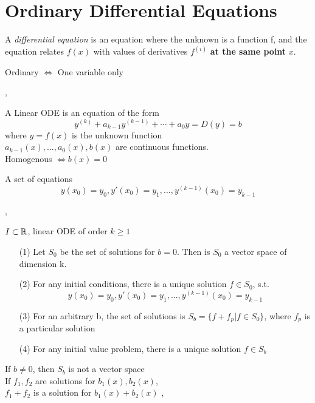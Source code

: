 \part{Ordinary Differential Equations}
\setcounter{section}{1}

\Def A \textit{differential equation} is an equation where the unknown is a function f, and the equation relates $f(x)$ with values of derivatives $f^{(i)}$ \textbf{at the same point} $x$.

\Def Ordinary $\iff$ One variable only

\sep

\Def A Linear ODE is an equation of the form
\[ y^{(k)} + a_{k - 1} y^{(k - 1)} + \cdots + a_0 y = D(y) = b \] 
where $y = f(x)$ is the unknown function \\
$a_{k - 1}(x), ..., a_0(x), b(x)$ are continuous functions. \\

\Def Homogenous $ \iff b(x) = 0$ 

 A set of equations
\[y(x_0) = y_0, y'(x_0) = y_1, ..., y^{(k - 1)}(x_0) = y_{k - 1} \]

\sep

\Satz[2.2.3] $I \subset \mathbb{R}$,  linear ODE of order $k \geq 1$
\begin{enumerate}
\item[(1)] Let $S_0$ be the set of solutions for $b = 0$. Then is $S_0$ a vector space of dimension k.
\item[(2)] For any initial conditions, there is a unique solution $f \in S_0$, s.t.
\[y(x_0) = y_0, y'(x_0) = y_1, ..., y^{(k - 1)}(x_0) = y_{k - 1} \]

\item[(3)] For an arbitrary b, the set of solutions is $S_b = \{f + f_p | f \in S_0\}$, where $f_p$ is a particular solution
\item[(4)] For any initial value problem, there is a unique solution $f \in S_b$
\end{enumerate}
\Bem If $b \neq 0$, then $S_b$ is not a vector space \\
\Bem If $f_1, f_2$ are solutions for $b_1(x), b_2(x)$, \\ $f_1 + f_2$ is a solution for $b_1(x) + b_2(x)$
\sep




